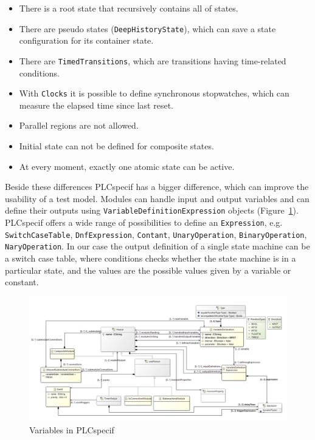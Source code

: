 \begin{itemize}
	\item There is a root state that recursively contains all of states.
	\item There are pseudo states (\texttt{DeepHistoryState}), which can save a state configuration for its container state.
	\item There are \texttt{TimedTransitions}, which are transitions having time-related conditions.
	\item With \texttt{Clocks} it is possible to define synchronous stopwatches, which can measure the elapsed time since last reset.
	\item Parallel regions are not allowed.
	\item Initial state can not be defined for composite states.
	\item At every moment, exactly one atomic state can be active. 
\end{itemize}

Beside these differences PLCspecif has a bigger difference, which can improve the usability of a test model. Modules can handle input and output variables and can define their outputs using \texttt{VariableDefinitionExpression} objects (Figure~\ref{fig:plchsm_variables}). PLCspecif offers a wide range of possibilities to define an \texttt{Expression}, e.g. \texttt{SwitchCaseTable}, \texttt{DnfExpression}, \texttt{Contant}, \texttt{UnaryOperation}, \texttt{BinaryOperation}, \texttt{NaryOperation}. In our case the output definition of a single state machine can be a switch case table, where conditions checks whether the state machine is in a particular state, and the values are the possible values given by a variable or constant.

\begin{figure}[htp]
\centering
\includegraphics[scale=0.6]{figures/plchsm_variables}
\caption{Variables in PLCspecif \cite{plcspecif}}
\label{fig:plchsm_variables}
\end{figure}

